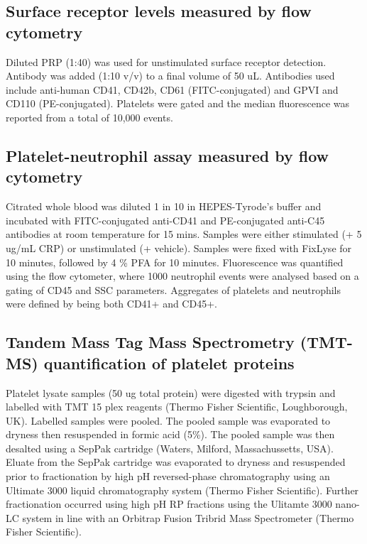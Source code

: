 \documentclass[11pt,twoside]{bristolthesis}
\begin{document}
\hypertarget{surface-receptor-levels-measured-by-flow-cytometry}{%
\subsection{Surface receptor levels measured by flow cytometry}\label{surface-receptor-levels-measured-by-flow-cytometry}}

Diluted PRP (1:40) was used for unstimulated surface receptor detection. Antibody was added (1:10 v/v) to a final volume of 50 uL. Antibodies used include anti-human CD41, CD42b, CD61 (FITC-conjugated) and GPVI and CD110 (PE-conjugated). Platelets were gated and the median fluorescence was reported from a total of 10,000 events.

\hypertarget{platelet-neutrophil-assay-measured-by-flow-cytometry}{%
\subsection{Platelet-neutrophil assay measured by flow cytometry}\label{platelet-neutrophil-assay-measured-by-flow-cytometry}}

Citrated whole blood was diluted 1 in 10 in HEPES-Tyrode's buffer and incubated with FITC-conjugated anti-CD41 and PE-conjugated anti-C45 antibodies at room temperature for 15 mins. Samples were either stimulated (+ 5 ug/mL CRP) or unstimulated (+ vehicle). Samples were fixed with FixLyse for 10 minutes, followed by 4 \% PFA for 10 minutes. Fluorescence was quantified using the flow cytometer, where 1000 neutrophil events were analysed based on a gating of CD45 and SSC parameters. Aggregates of platelets and neutrophils were defined by being both CD41+ and CD45+.

\hypertarget{tandem-mass-tag-mass-spectrometry-tmt-ms-quantification-of-platelet-proteins}{%
\subsection{Tandem Mass Tag Mass Spectrometry (TMT-MS) quantification of platelet proteins}\label{tandem-mass-tag-mass-spectrometry-tmt-ms-quantification-of-platelet-proteins}}

Platelet lysate samples (50 ug total protein) were digested with trypsin and labelled with TMT 15 plex reagents (Thermo Fisher Scientific, Loughborough, UK). Labelled samples were pooled. The pooled sample was evaporated to dryness then resuspended in formic acid (5\%). The pooled sample was then desalted using a SepPak cartridge (Waters, Milford, Massachussetts, USA). Eluate from the SepPak cartridge was evaporated to dryness and resuspended prior to fractionation by high pH reversed-phase chromatography using an Ultimate 3000 liquid chromatography system (Thermo Fisher Scientific). Further fractionation occurred using high pH RP fractions using the Ulitamte 3000 nano-LC system in line with an Orbitrap Fusion Tribrid Mass Spectrometer (Thermo Fisher Scientific).
\end{document}
